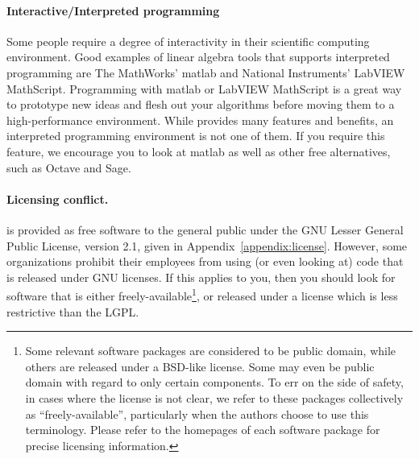 \paragraph{Interactive/Interpreted programming}
Some people require a degree of interactivity in their scientific computing
environment.
Good examples of linear algebra tools that supports interpreted programming
are The MathWorks' {\sc matlab} and National Instruments' LabVIEW MathScript.
Programming with {\sc matlab} or LabVIEW MathScript is a great way to prototype
new ideas and flesh out your algorithms before moving them to a high-performance
environment.
While \libflame provides many features and benefits, an interpreted programming
environment is not one of them.
If you require this feature, we encourage you to look at {\sc matlab} as well
as other free alternatives, such as Octave and Sage.

\paragraph{Licensing conflict.}
\libflame is provided as free software to the general public under the
GNU Lesser General Public License, version 2.1,
given in Appendix~\ref{appendix:license}.
However, some organizations prohibit their employees from using (or even
looking at) code that is released under GNU licenses.
If this applies to you, then you should look for software that is
either freely-available\footnote{Some relevant software packages are
considered to be public domain, while others are released under a BSD-like
license.
Some may even be public domain with regard to only certain components.
To err on the side of safety, in cases where the license is not clear, we
refer to these packages collectively as ``freely-available'', particularly
when the authors choose to use this terminology.
Please refer to the homepages of each software package for precise
licensing information.}, or released under a license which is less
restrictive than the LGPL. \\

